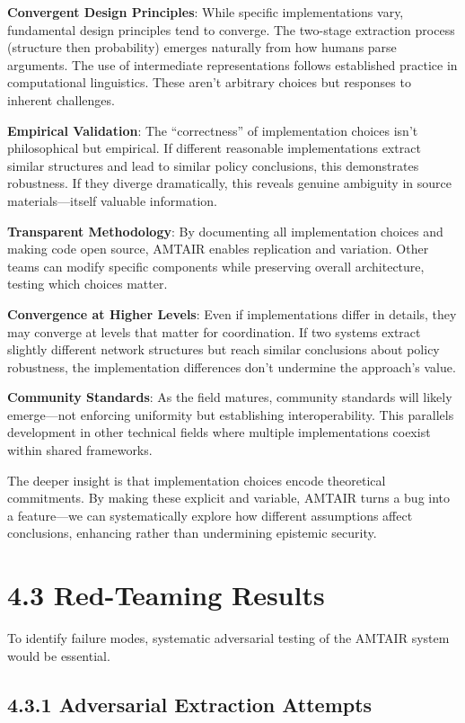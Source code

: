\documentclass[
  11pt,
  letterpaper,
]{book}
\begin{document}
\textbf{Convergent Design Principles}: While specific implementations
vary, fundamental design principles tend to converge. The two-stage
extraction process (structure then probability) emerges naturally from
how humans parse arguments. The use of intermediate representations
follows established practice in computational linguistics. These aren't
arbitrary choices but responses to inherent challenges.

\textbf{Empirical Validation}: The ``correctness'' of implementation
choices isn't philosophical but empirical. If different reasonable
implementations extract similar structures and lead to similar policy
conclusions, this demonstrates robustness. If they diverge dramatically,
this reveals genuine ambiguity in source materials---itself valuable
information.

\textbf{Transparent Methodology}: By documenting all implementation
choices and making code open source, AMTAIR enables replication and
variation. Other teams can modify specific components while preserving
overall architecture, testing which choices matter.

\textbf{Convergence at Higher Levels}: Even if implementations differ in
details, they may converge at levels that matter for coordination. If
two systems extract slightly different network structures but reach
similar conclusions about policy robustness, the implementation
differences don't undermine the approach's value.

\textbf{Community Standards}: As the field matures, community standards
will likely emerge---not enforcing uniformity but establishing
interoperability. This parallels development in other technical fields
where multiple implementations coexist within shared frameworks.

The deeper insight is that implementation choices encode theoretical
commitments. By making these explicit and variable, AMTAIR turns a bug
into a feature---we can systematically explore how different assumptions
affect conclusions, enhancing rather than undermining epistemic
security.

\section{4.3 Red-Teaming Results}\label{sec-red-teaming}

To identify failure modes, systematic adversarial testing of the AMTAIR
system would be essential.

\subsection{4.3.1 Adversarial Extraction
Attempts}\label{sec-adversarial-extraction}
\end{document}

